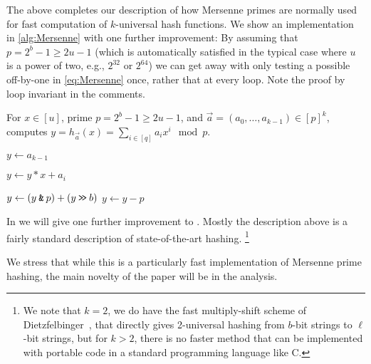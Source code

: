 \vspace{1em}

The above completes our description of how Mersenne primes are
normally used for fast computation of $k$-universal hash functions.
We show an implementation in \cref{alg:Mersenne} with one further improvement:
By assuming that $p=2^b-1\geq 2u-1$
(which is automatically satisfied in the typical case where $u$ is a power
of two, e.g., $2^{32}$ or $2^{64}$)
we can get away with only testing a possible off-by-one in \cref{eq:Mersenne} once, rather that at every loop.
Note the proof by loop invariant in the comments.

\begin{algorithm}[H]
   \caption{
      For $x\in [u]$, prime $p=2^b-1\geq 2u-1$,
      and $\vec a=(a_0,\ldots,a_{k-1})\in[p]^k$,
      computes $y=h_{\vec a}(x)=\sum_{i\in[q]}a_i x^i\mod p$.
   }\label{alg:Mersenne}
   \begin{algorithmic}
      \State $y\gets a_{k-1}$

      \State $y\gets y*x+a_i$

      \State $y\gets (y\mathbin{\texttt{\&}} p)+(y\mathbin{\texttt{>\!>}} b)$
      \EndFor
      \State $y\gets y-p$
      \EndIf
   \end{algorithmic}
\end{algorithm}


In  we will give one further improvement to .
Mostly the description above is a fairly standard description of state-of-the-art hashing.
\footnote{We note that $k=2$, we do have the fast multiply-shift scheme of Dietzfelbinger~\cite{dietzfel96universal}, that directly gives 2-universal
hashing from $b$-bit strings to $\ell$-bit strings, but for $k>2$,
there is no faster method that can be implemented with portable code
in a standard programming language like C.}

We stress that while this is a particularly fast implementation of Mersenne prime hashing, the main novelty of the paper will be in the analysis.






